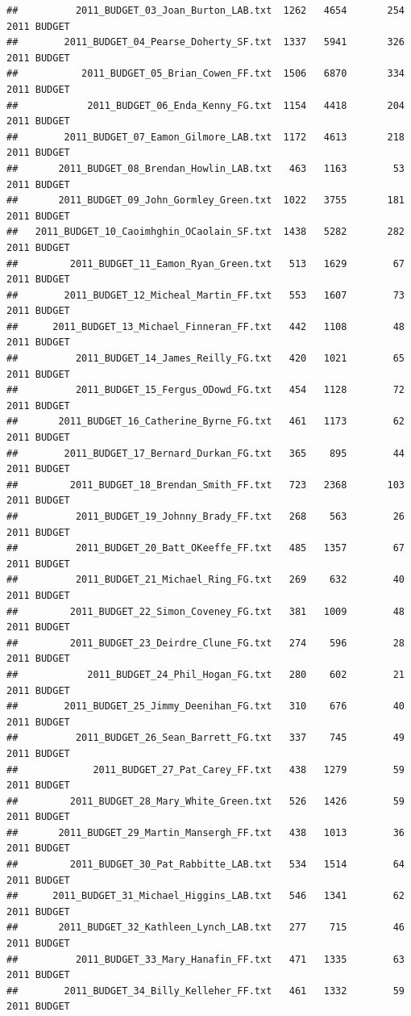 \documentclass[11pt]{article}\usepackage[]{graphicx}\usepackage[]{color}
\makeatletter
\newenvironment{kframe}{%
 \def\at@end@of@kframe{}%
 \ifinner\ifhmode%
  \def\at@end@of@kframe{\end{minipage}}%
  \begin{minipage}{\columnwidth}%
 \fi\fi%
 \def\FrameCommand##1{\hskip\@totalleftmargin \hskip-\fboxsep
 \colorbox{shadecolor}{##1}\hskip-\fboxsep
     \hskip-\linewidth \hskip-\@totalleftmargin \hskip\columnwidth}%
 \MakeFramed {\advance\hsize-\width
   \@totalleftmargin\z@ \linewidth\hsize
   \@setminipage}}%
 {\par\unskip\endMakeFramed%
 \at@end@of@kframe}
\newenvironment{knitrout}{}{} %
\makeatother
\begin{document}
\begin{knitrout}
\begin{kframe}
\begin{verbatim}
##          2011_BUDGET_03_Joan_Burton_LAB.txt  1262   4654       254 2011 BUDGET
##        2011_BUDGET_04_Pearse_Doherty_SF.txt  1337   5941       326 2011 BUDGET
##           2011_BUDGET_05_Brian_Cowen_FF.txt  1506   6870       334 2011 BUDGET
##            2011_BUDGET_06_Enda_Kenny_FG.txt  1154   4418       204 2011 BUDGET
##        2011_BUDGET_07_Eamon_Gilmore_LAB.txt  1172   4613       218 2011 BUDGET
##       2011_BUDGET_08_Brendan_Howlin_LAB.txt   463   1163        53 2011 BUDGET
##       2011_BUDGET_09_John_Gormley_Green.txt  1022   3755       181 2011 BUDGET
##   2011_BUDGET_10_Caoimhghin_OCaolain_SF.txt  1438   5282       282 2011 BUDGET
##         2011_BUDGET_11_Eamon_Ryan_Green.txt   513   1629        67 2011 BUDGET
##        2011_BUDGET_12_Micheal_Martin_FF.txt   553   1607        73 2011 BUDGET
##      2011_BUDGET_13_Michael_Finneran_FF.txt   442   1108        48 2011 BUDGET
##          2011_BUDGET_14_James_Reilly_FG.txt   420   1021        65 2011 BUDGET
##          2011_BUDGET_15_Fergus_ODowd_FG.txt   454   1128        72 2011 BUDGET
##       2011_BUDGET_16_Catherine_Byrne_FG.txt   461   1173        62 2011 BUDGET
##        2011_BUDGET_17_Bernard_Durkan_FG.txt   365    895        44 2011 BUDGET
##         2011_BUDGET_18_Brendan_Smith_FF.txt   723   2368       103 2011 BUDGET
##          2011_BUDGET_19_Johnny_Brady_FF.txt   268    563        26 2011 BUDGET
##          2011_BUDGET_20_Batt_OKeeffe_FF.txt   485   1357        67 2011 BUDGET
##          2011_BUDGET_21_Michael_Ring_FG.txt   269    632        40 2011 BUDGET
##         2011_BUDGET_22_Simon_Coveney_FG.txt   381   1009        48 2011 BUDGET
##         2011_BUDGET_23_Deirdre_Clune_FG.txt   274    596        28 2011 BUDGET
##            2011_BUDGET_24_Phil_Hogan_FG.txt   280    602        21 2011 BUDGET
##        2011_BUDGET_25_Jimmy_Deenihan_FG.txt   310    676        40 2011 BUDGET
##          2011_BUDGET_26_Sean_Barrett_FG.txt   337    745        49 2011 BUDGET
##             2011_BUDGET_27_Pat_Carey_FF.txt   438   1279        59 2011 BUDGET
##         2011_BUDGET_28_Mary_White_Green.txt   526   1426        59 2011 BUDGET
##       2011_BUDGET_29_Martin_Mansergh_FF.txt   438   1013        36 2011 BUDGET
##         2011_BUDGET_30_Pat_Rabbitte_LAB.txt   534   1514        64 2011 BUDGET
##      2011_BUDGET_31_Michael_Higgins_LAB.txt   546   1341        62 2011 BUDGET
##       2011_BUDGET_32_Kathleen_Lynch_LAB.txt   277    715        46 2011 BUDGET
##          2011_BUDGET_33_Mary_Hanafin_FF.txt   471   1335        63 2011 BUDGET
##        2011_BUDGET_34_Billy_Kelleher_FF.txt   461   1332        59 2011 BUDGET

\end{verbatim}
\end{kframe}
\end{knitrout}
\end{document}
